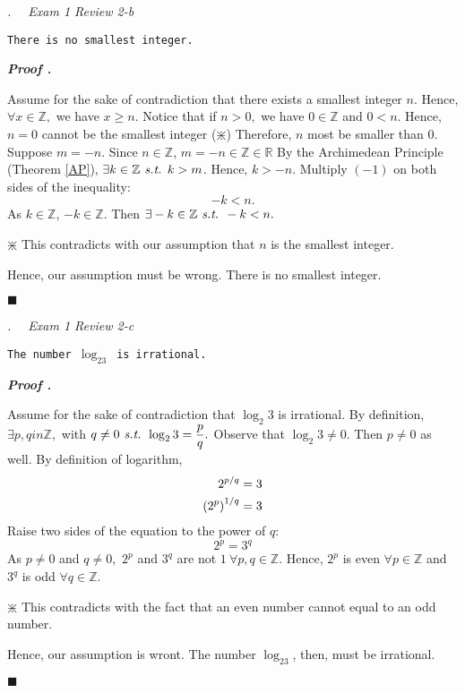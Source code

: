 \documentclass[11pt,letter]{article}
\newcounter{nq}[section]
\newcounter{np}[section]
\newenvironment*{p}{\par\noindent\textbf{\textit{Proof \stepcounter{np}\thenp. }}\par}{\par\hfill $\blacksquare$\par}
\newenvironment*{q}[1]{\noindent\emph{\thesection.\stepcounter{nq}\thenq$\quad $ #1}\par\noindent\texttt}{}
\def\Z{{\mathbb{Z}}}
\def\R{{\mathbb{R}}}
\def\st{\emph{ s.t. }}
\begin{document}
\begin{framed}\begin{q}
	{Exam 1 Review 2-b}
	{There is no smallest integer.}
\end{q}\end{framed}
\begin{p}
	Assume for the sake of contradiction that there exists a smallest integer $n$. Hence, $\forall x\in\Z,$ we have $x\geq n.$ Notice that if $n>0,$ we have $0\in\Z$ and $0<n.$ Hence, $n=0$ cannot be the smallest integer ($\divideontimes$) Therefore, $n$ most be smaller than $0$. Suppose $m=-n$. Since $n\in\Z$, $m=-n\in\Z\in\R$ By the Archimedean Principle (Theorem \ref{AP}), $\exists k\in\Z\st k>m$. Hence, $k>-n.$ Multiply $(-1)$ on both sides of the inequality: \[-k<n.\] As $k\in\Z$, $-k\in\Z$. Then $\exists -k\in\Z\st -k<n.$\begin{center}$\divideontimes$ This contradicts with our assumption that $n$ is the smallest integer. \end{center} Hence, our assumption must be wrong. There is no smallest integer. 
\end{p}

\begin{framed}\begin{q}
	{Exam 1 Review 2-c}
	{The number $\log_23$ is irrational.}
\end{q}\end{framed}
\begin{p}
	Assume for the sake of contradiction that $\log_2{3}$ is irrational. By definition, $\exists p,qin\Z,$ with $q\neq0\st\log_2{3}=\dfrac{p}{q}.$ Observe that $\log_2{3}\neq0$. Then $p\neq0$ as well. By definition of logarithm, \[\begin{aligned}2^{p/q}&=3\\\qty(2^p)^{1/q}&=3\end{aligned}\] Raise two sides of the equation to the power of $q$: \[2^p=3^q\] As $p\neq0$ and $q\neq0,$ $2^p$ and $3^q$ are not $1\ \forall p,q\in\Z.$ Hence, $2^p$ is even $\forall p\in\Z$ and $3^q$ is odd $\forall q\in\Z.$\begin{center}$\divideontimes$ This contradicts with the fact that an even number cannot equal to an odd number. \end{center} Hence, our assumption is wront. The number $\log_23$, then, must be irrational.
\end{p}
\end{document}
